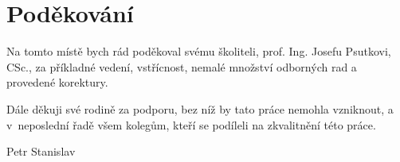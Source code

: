 \chapter*{Poděkování}

\noindent Na tomto místě bych rád poděkoval svému školiteli, prof. Ing. Josefu Psutkovi, CSc., za příkladné vedení, vstřícnost, nemalé množství odborných rad a provedené korektury.

\vspace*{1cm}

\noindent Dále děkuji své rodině za podporu, bez níž by tato práce nemohla vzniknout, a v~neposlední řadě všem kolegům, kteří se podíleli na zkvalitnění této práce.

\vspace*{1cm}
\noindent \hspace*{12cm} {Petr Stanislav}


